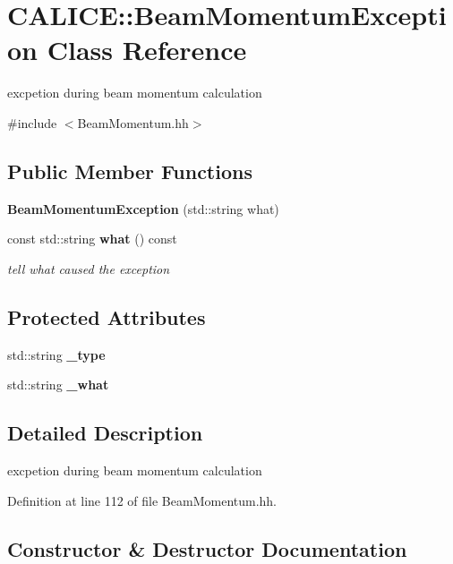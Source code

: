 \section{CALICE::BeamMomentumException Class Reference}
\label{classCALICE_1_1BeamMomentumException}


excpetion during beam momentum calculation  


{\ttfamily \#include $<$BeamMomentum.hh$>$}\subsection*{Public Member Functions}
\begin{DoxyCompactItemize}
\item 
{\bf BeamMomentumException} (std::string what)
\item 
const std::string {\bf what} () const \label{classCALICE_1_1BeamMomentumException_abf96d139d64de8fd11114234cac573f8}

\begin{DoxyCompactList}\small\item\em tell what caused the exception \item\end{DoxyCompactList}\end{DoxyCompactItemize}
\subsection*{Protected Attributes}
\begin{DoxyCompactItemize}
\item 
std::string {\bfseries \_\-type}\label{classCALICE_1_1BeamMomentumException_a6e2c3f65164d99f3e01a2eb02d88701d}

\item 
std::string {\bfseries \_\-what}\label{classCALICE_1_1BeamMomentumException_a8cbcb9dc73807afc3db99a463baa0933}

\end{DoxyCompactItemize}


\subsection{Detailed Description}
excpetion during beam momentum calculation 

Definition at line 112 of file BeamMomentum.hh.

\subsection{Constructor \& Destructor Documentation}
